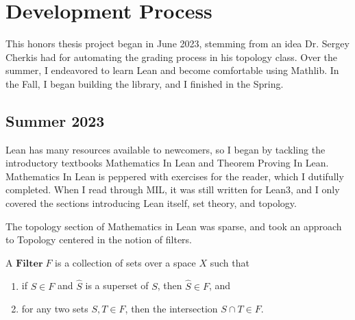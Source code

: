 

\chapter[Development]{Development Process}

This honors thesis project began in June 2023, stemming from
an idea Dr. Sergey Cherkis had for automating the grading
process in his topology class. Over the summer, I endeavored
to learn Lean and become comfortable using Mathlib. In the Fall,
I began building the library, and I finished in the Spring.

\section{Summer 2023}

Lean has many resources available to newcomers, so I began
by tackling the introductory textbooks Mathematics In Lean and
Theorem Proving In Lean. Mathematics In Lean is peppered with
exercises for the reader, which I dutifully completed. When
I read through MIL, it was still written for Lean3, and I only 
covered the sections introducing Lean itself, set theory, and
topology.

The topology section of Mathematics in Lean was sparse, and took 
an approach to Topology centered in the notion of filters. 
\begin{definition}
    A $\mathbf{Filter}\;F$ is a collection of sets over a space $X$
    such that \begin{enumerate}
        \item if $S\in F$ and $\hat{S}$ is a superset of $S$, then
        $\hat{S}\in F$, and
        \item for any two sets $S,T\in F$, then  the intersection $S\cap T\in F$.
    \end{enumerate}
\end{definition}




